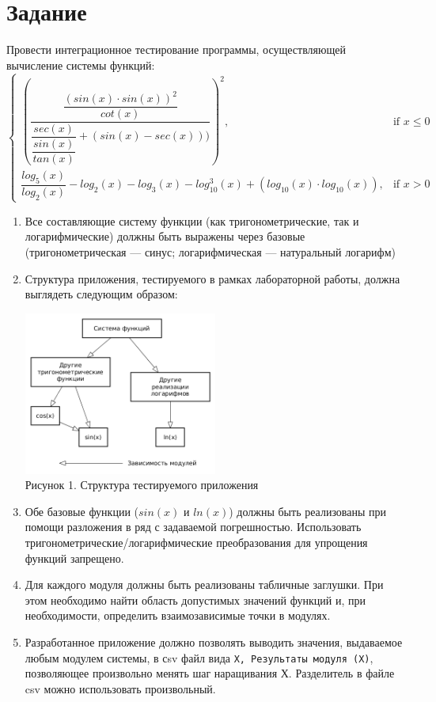 \documentclass[listings]{labreport}
\begin{document}
\maketitlepage

\section*{Задание}

Провести интеграционное тестирование программы, осуществляющей вычисление системы функций:
\[
  \begin{cases}
    \left( \dfrac{\dfrac{\left( sin(x) \cdot sin(x) \right)^2}{cot(x)}}{\dfrac{sec(x)}{\dfrac{sin(x)}{tan(x)}} + (sin(x) - sec(x)))} \right)^2, & \text{if } x \leqslant 0 \\[48pt]
    \dfrac{log_5(x)}{log_2(x)} - log_2(x) - log_3(x) - log_{10}^3(x) + (log_{10}(x) \cdot log_{10}(x)), & \text{if } x > 0
  \end{cases}
\]

\begin{enumerate}
\item Все составляющие систему функции (как тригонометрические, так и логарифмические) должны быть выражены через базовые (тригонометрическая — синус; логарифмическая — натуральный логарифм)
\item Структура приложения, тестируемого в рамках лабораторной работы, должна выглядеть следующим образом:
  \begin{center}
  \includegraphics[width=0.5\textwidth]{Lab2_architecture.png}\\
  Рисунок 1. Структура тестируемого приложения
  \end{center}
\item Обе базовые функции ($sin(x)$ и $ln(x)$) должны быть реализованы при помощи разложения в ряд с задаваемой погрешностью. Использовать тригонометрические/логарифмические преобразования для упрощения функций запрещено.
\item Для каждого модуля должны быть реализованы табличные заглушки. При этом необходимо найти область допустимых значений функций и, при необходимости, определить взаимозависимые точки в модулях.
\item Разработанное приложение должно позволять выводить значения, выдаваемое любым модулем системы, в сsv файл вида \verb|X, Результаты модуля (X)|, позволяющее произвольно менять шаг наращивания Х. Разделитель в файле csv можно использовать произвольный.
\end{enumerate}
\end{document}
